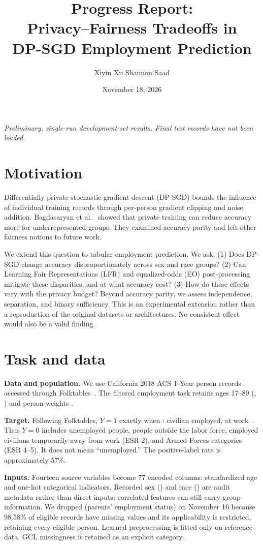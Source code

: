 \documentclass[11pt,letterpaper]{article}
\title{\vspace{-1.6em}Progress Report:\\Privacy--Fairness Tradeoffs in\\DP-SGD Employment Prediction\vspace{-0.4em}}
\author{Xiyin Xu \qquad Shannon Saad}
\date{November 18, 2026}
\newcommand{\code}[1]{\texttt{\detokenize{#1}}}
\begin{document}
\maketitle
\vspace{-1em}
\begin{center}\small\textit{Preliminary, single-run development-set results. Final test records have not been loaded.}\end{center}

\section{Motivation}
Differentially private stochastic gradient descent (DP-SGD) bounds the influence of individual training records through per-person gradient clipping and noise addition. Bagdasaryan et al.~\cite{bagdasaryan2019} showed that private training can reduce accuracy more for underrepresented groups. They examined accuracy parity and left other fairness notions to future work.

We extend this question to tabular employment prediction. We ask: (1) Does DP-SGD change accuracy disproportionately across sex and race groups? (2) Can Learning Fair Representations (LFR) and equalized-odds (EO) post-processing mitigate these disparities, and at what accuracy cost? (3) How do these effects vary with the privacy budget? Beyond accuracy parity, we assess independence, separation, and binary sufficiency. This is an experimental extension rather than a reproduction of the original datasets or architectures. No consistent effect would also be a valid finding.

\section{Task and data}
\textbf{Data and population.} We use California 2018 ACS 1-Year person records accessed through Folktables~\cite{ding2021}. The filtered employment task retains ages 17--89 (\code{AGEP > 16}, \code{AGEP < 90}) and person weights \code{PWGTP >= 1}.

\textbf{Target.} Following Folktables, $Y=1$ exactly when \code{ESR = 1}: civilian employed, at work~\cite{census2018}. Thus $Y=0$ includes unemployed people, people outside the labor force, employed civilians temporarily away from work (ESR 2), and Armed Forces categories (ESR 4--5). It does not mean ``unemployed.'' The positive-label rate is approximately 57\%.

\textbf{Inputs.} Fourteen source variables become 77 encoded columns: standardized age and one-hot categorical indicators. Recorded sex (\code{SEX}) and race (\code{RAC1P}) are audit metadata rather than direct inputs; correlated features can still carry group information. We dropped \code{ESP} (parents' employment status) on November 16 because 98.58\% of eligible records have missing values and its applicability is restricted, retaining every eligible person. Learned preprocessing is fitted only on reference data. GCL missingness is retained as an explicit category.
\end{document}
